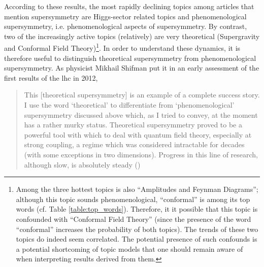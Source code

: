 \documentclass[smallextended]{svjour3}
\begin{document}
According to these results, the most rapidly declining topics among articles that mention supersymmetry are Higgs-sector related topics and phenomenological supersymmetry, i.e. phenomenological aspects of supersymmetry. By contrast, two of the increasingly active topics (relatively) are very theoretical (Supergravity and Conformal Field Theory)\footnote{Among the three hottest topics is also ``Amplitudes and Feynman Diagrams''; although this topic sounds phenomenological, ``conformal'' is among its top words (cf. Table \ref{table:top_words}). Therefore, it it possible that this topic is confounded with ``Conformal Field Theory'' (since the presence of the word ``conformal'' increases the probability of both topics). The trends of these two topics do indeed seem correlated. The potential presence of such confounds is a potential shortcoming of topic models that one should remain aware of when interpreting results derived from them.}. In order to understand these dynamics, it is therefore useful to distinguish theoretical supersymmetry from phenomenological supersymmetry. As physicist Mikhail Shifman put it in an early assessment of the first results of the \gls{lhc} in 2012, 

\begin{quote}
    This [theoretical supersymmetry] is an example of a complete success story. I use the word ‘theoretical’ to differentiate from ‘phenomenological’ supersymmetry discussed above which, as I tried to convey, at the moment has a rather murky status. Theoretical supersymmetry proved to be a powerful tool with which to deal with quantum field theory, especially at strong coupling, a regime which was considered intractable for decades (with some exceptions in two dimensions). Progress in this line of research, although slow, is absolutely steady (\citealt[p.~6]{SHIFMAN2012})
\end{quote}


\end{document}
